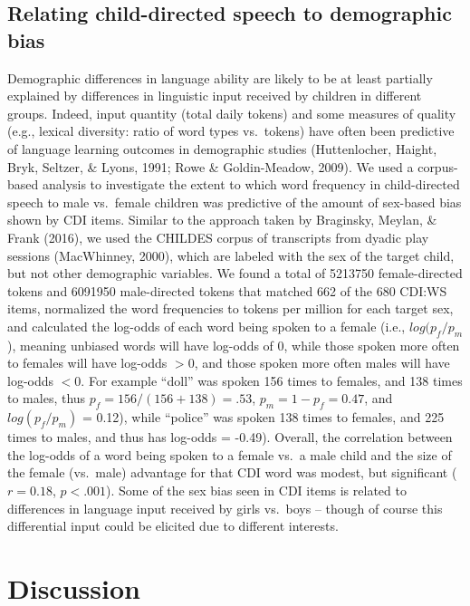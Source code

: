\documentclass[10pt, letterpaper]{article}
\begin{document}
\hypertarget{relating-child-directed-speech-to-demographic-bias}{%
\subsection{Relating child-directed speech to demographic
bias}\label{relating-child-directed-speech-to-demographic-bias}}

Demographic differences in language ability are likely to be at least
partially explained by differences in linguistic input received by
children in different groups. Indeed, input quantity (total daily
tokens) and some measures of quality (e.g., lexical diversity: ratio of
word types vs.~tokens) have often been predictive of language learning
outcomes in demographic studies (Huttenlocher, Haight, Bryk, Seltzer, \&
Lyons, 1991; Rowe \& Goldin-Meadow, 2009). We used a corpus-based
analysis to investigate the extent to which word frequency in
child-directed speech to male vs.~female children was predictive of the
amount of sex-based bias shown by CDI items. Similar to the approach
taken by Braginsky, Meylan, \& Frank (2016), we used the CHILDES corpus
of transcripts from dyadic play sessions (MacWhinney, 2000), which are
labeled with the sex of the target child, but not other demographic
variables. We found a total of 5213750 female-directed tokens and
6091950 male-directed tokens that matched 662 of the 680 CDI:WS items,
normalized the word frequencies to tokens per million for each target
sex, and calculated the log-odds of each word being spoken to a female
(i.e., \(log(p_{f} / p_{m}\)), meaning unbiased words will have log-odds
of 0, while those spoken more often to females will have log-odds
\(>0\), and those spoken more often males will have log-odds \(<0\). For
example ``doll'' was spoken 156 times to females, and 138 times to
males, thus \(p_{f} = 156/(156+138) = .53\), \(p_{m} = 1-p_{f} = 0.47\),
and \(log(p_{f}/p_{m})\) = 0.12), while ``police'' was spoken 138 times
to females, and 225 times to males, and thus has log-odds = -0.49).
Overall, the correlation between the log-odds of a word being spoken to
a female vs.~a male child and the size of the female (vs.~male)
advantage for that CDI word was modest, but significant (\(r=0.18\),
\(p<.001\)). Some of the sex bias seen in CDI items is related to
differences in language input received by girls vs.~boys -- though of
course this differential input could be elicited due to different
interests.

\hypertarget{discussion}{%
\section{Discussion}\label{discussion}}
\end{document}

